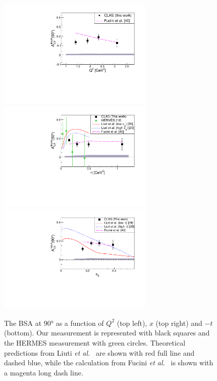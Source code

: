 \documentclass[aps,prc,preprint,superscriptaddress]{revtex4}
\begin{document}
\begin{figure}[tbp!]
\center
\includegraphics[width=7.4cm]{fig3/ALU_90_p_vs_Q2_shortscenrario.pdf}
\includegraphics[width=7.4cm]{fig3/ALU_90_p_vs_t_shortscenrario.pdf}
\includegraphics[width=7.4cm]{fig3/ALU_90_p_vs_x_shortscenrario.pdf}
	\caption{The BSA at 90° as a function of  $Q^2$ (top left), $x$ (top right) and 
	$-t$ (bottom). Our measurement is represented with black squares and the HERMES 
	measurement \cite{Airapetian:2009cga} with green circles. Theoretical predictions 
	from Liuti {\it et al.}~\cite{Liuti:2005gi,GonzalezHernandez:2012jv} are shown 
	with red full line and dashed blue, while the calculation from Fucini 
	{\it et al.}~\cite{Fucini:2019xlc} is shown with a magenta long dash line.}
\label{fig:IncALU}
\end{figure}
\end{document}
